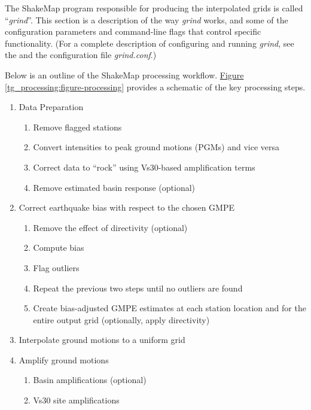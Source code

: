 \documentclass[letterpaper,10pt,english]{sphinxmanual}
\begin{document}
The ShakeMap program responsible for producing the interpolated grids is called
``\emph{grind}”.  This section is a description of the way \emph{grind} works, and some of the
configuration parameters and command-line flags that control specific functionality. (For
a complete description of configuring and running \emph{grind}, see the {\hyperref[software_guide:sm35\string-software\string-guide]{}} and the
configuration file \emph{grind.conf}.)

Below is an outline of the ShakeMap processing workflow. \hyperref[tg_processing:figure-processing]{Figure  \ref*{tg_processing:figure-processing}} provides
a schematic of the key processing steps.
\begin{enumerate}
\item {} 
Data Preparation
\begin{enumerate}
\item {} 
Remove flagged stations

\item {} 
Convert intensities to peak ground motions (PGMs) and vice versa

\item {} 
Correct data to ``rock'' using Vs30-based amplification terms

\item {} 
Remove estimated basin response (optional)

\end{enumerate}

\item {} 
Correct earthquake bias with respect to the chosen GMPE
\begin{enumerate}
\item {} 
Remove the effect of directivity (optional)

\item {} 
Compute bias

\item {} 
Flag outliers

\item {} 
Repeat the previous two steps until no outliers are found

\item {} 
Create bias-adjusted GMPE estimates at each station location and for the entire output grid
(optionally, apply directivity)

\end{enumerate}

\item {} 
Interpolate ground motions to a uniform grid

\item {} 
Amplify ground motions
\begin{enumerate}
\item {} 
Basin amplifications (optional)

\item {} 
Vs30 site amplifications

\end{enumerate}

\end{enumerate}
\end{document}
